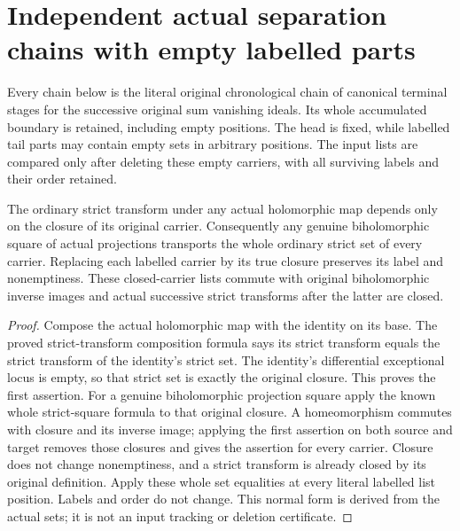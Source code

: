 \section{Independent actual separation chains with empty labelled parts}

Every chain below is the literal original chronological chain of canonical
terminal stages for the successive original sum vanishing ideals. Its
whole accumulated boundary is retained, including empty positions. The
head is fixed, while labelled tail parts may contain empty sets in arbitrary
positions. The input lists are compared only after deleting these empty
carriers, with all surviving labels and their order retained.

\begin{lemma}
\label{hir:original-separation-chain-whole-strict-normal-form}
\leanok
The ordinary strict transform under any actual holomorphic map depends
only on the closure of its original carrier. Consequently any genuine
biholomorphic square of actual projections transports the whole ordinary
strict set of every carrier. Replacing each labelled carrier by its true
closure preserves its label and nonemptiness. These closed-carrier lists
commute with original biholomorphic inverse images and actual successive
strict transforms after the latter are closed.
\end{lemma}
\begin{proof}
Compose the actual holomorphic map with the identity on its base. The
proved strict-transform composition formula says its strict transform
equals the strict transform of the identity's strict set. The identity's
differential exceptional locus is empty, so that strict set is exactly
the original closure. This proves the first assertion. For a genuine
biholomorphic projection square apply the known whole strict-square
formula to that original closure. A homeomorphism commutes with closure
and its inverse image; applying the first assertion on both source and
target removes those closures and gives the assertion for every carrier.
Closure does not change nonemptiness, and a strict transform is already
closed by its original definition. Apply these whole set equalities at
every literal labelled list position. Labels and order do not change.
This normal form is derived from the actual sets; it is not an input
tracking or deletion certificate.
\end{proof}

